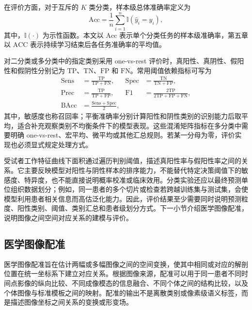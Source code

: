 在评价方面，对于互斥的 $K$ 类分类，样本级总体准确率定义为
\begin{equation}
\mathrm{Acc}
=
\frac{1}{n}
\sum_{i=1}^{n}
\mathbb{I}\!\left(\widehat{y}_i=y_i\right),
\label{eq:foundations-cls-accuracy}
\end{equation}
其中，$\mathbb{I}(\cdot)$ 为示性函数。本文以 $\mathrm{Acc}$ 表示单个分类任务的样本级准确率，第五章以 $\mathrm{ACC}$ 表示持续学习结束后各任务准确率的平均值。

对二分类或多分类中的指定类别采用 one-vs-rest 评价时，真阳性、真阴性、假阳性和假阴性分别记为 $\mathrm{TP}$、$\mathrm{TN}$、$\mathrm{FP}$ 和 $\mathrm{FN}$。常用阈值依赖指标可写为
\begin{equation}
\begin{aligned}
\mathrm{Sens}
&=
\frac{\mathrm{TP}}{\mathrm{TP}+\mathrm{FN}},
&
\mathrm{Spec}
&=
\frac{\mathrm{TN}}{\mathrm{TN}+\mathrm{FP}},
\\
\mathrm{Prec}
&=
\frac{\mathrm{TP}}{\mathrm{TP}+\mathrm{FP}},
&
\mathrm{F1}
&=
\frac{2\mathrm{TP}}
{2\mathrm{TP}+\mathrm{FP}+\mathrm{FN}},
\\
\mathrm{BAcc}
&=
\frac{\mathrm{Sens}+\mathrm{Spec}}{2},
&&
\end{aligned}
\label{eq:foundations-cls-metrics}
\end{equation}
其中，敏感度也称召回率；平衡准确率分别计算阳性和阴性类别的识别能力后取平均，适合补充观察类别不均衡条件下的模型表现\cite{brodersen2010balanced}。这些混淆矩阵指标在多分类中需要明确 one-vs-rest、宏平均、微平均或其他汇总规则。若某一分母为零，评价实现也必须显式规定处理方式。

受试者工作特征曲线下面积通过遍历判别阈值，描述真阳性率与假阳性率之间的关系\cite{fawcett2006roc}。它主要反映模型对阳性与阴性样本的排序能力，不能替代特定决策阈值下的敏感度、特异度，也不能直接说明概率校准或临床效用。分类实验还应以最终预测单位组织数据划分；例如，同一患者的多个切片或检查若跨越训练集与测试集，会使模型利用患者相关信息而高估泛化能力\cite{willemink2020preparing}。因此，评价结果至少需要同时说明预测粒度、阳性类别、阈值、类别汇总和患者级划分方式。下一小节介绍医学图像配准，说明图像之间空间对应关系的建模与评价。


\subsection{医学图像配准}
\label{subsec:foundations-registration}

医学图像配准旨在估计两幅或多幅图像之间的空间变换，使其中相同或对应的解剖位置在统一坐标系下建立对应关系。根据图像来源，配准可以用于同一患者不同时间点影像的纵向比较、不同成像模态的信息融合、不同个体之间的结构比较，以及个体图像与标准模板之间的映射\cite{sotiras2013deformable}。配准的输出不是离散类别或像素级语义标签，而是描述图像坐标之间关系的变换或形变场。

